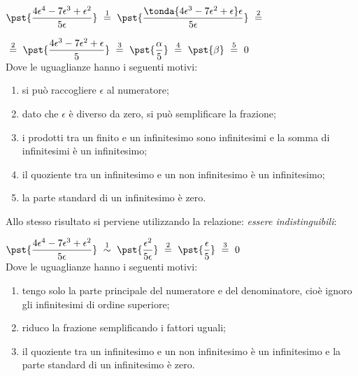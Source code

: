\begin{esempio}

\(\pst{\dfrac{4 \epsilon^4 -7 \epsilon^3 + \epsilon^2}{5 \epsilon}} 
~ \stackrel{1}{=} ~
  \pst{\dfrac{\tonda{4 \epsilon^3 -7 \epsilon^2 + \epsilon} \epsilon}
                    {5 \epsilon}} 
~ \stackrel{2}{=} ~\)

\(~ \stackrel{2}{=} ~ 
  \pst{\dfrac{4 \epsilon^3 -7 \epsilon^2 + \epsilon}{5}} 
~ \stackrel{3}{=} ~
  \pst{\dfrac{\alpha}{5}}
~ \stackrel{4}{=} ~
  \pst{\beta}
~ \stackrel{5}{=} ~
  0\)\\

Dove le uguaglianze hanno i seguenti motivi:
\begin{enumerate} [nosep]
 \item si può raccogliere \(\epsilon\) al numeratore; 
 \item dato che \(\epsilon\) è diverso da zero, si può semplificare la 
frazione; 
 \item i prodotti tra un finito e un infinitesimo sono infinitesimi e la 
somma di infinitesimi è un infinitesimo;
 \item il quoziente tra un infinitesimo e un non infinitesimo è un 
infinitesimo;
 \item la parte standard di un infinitesimo è zero.
\end{enumerate}
\end{esempio}

\begin{esempio}
Allo stesso risultato si perviene utilizzando la relazione: \emph{essere 
indistinguibili}:

\(\pst{\dfrac{4 \epsilon^4 -7 \epsilon^3 + \epsilon^2}{5 \epsilon}} 
~ \stackrel{1}{\sim} ~
  \pst{\dfrac{\epsilon^2}{5 \epsilon}} 
~ \stackrel{2}{=} ~
  \pst{\dfrac{\epsilon}{5}}
~ \stackrel{3}{=} ~
  0\)\\

Dove le uguaglianze hanno i seguenti motivi:
\begin{enumerate} [nosep]
 \item tengo solo la parte principale del numeratore e del denominatore, 
cioè ignoro gli infinitesimi di ordine superiore; 
 \item riduco la frazione semplificando i fattori uguali; 
 \item il quoziente tra un infinitesimo e un non infinitesimo è un 
infinitesimo e la parte standard di un infinitesimo è zero.
\end{enumerate}
\end{esempio}

